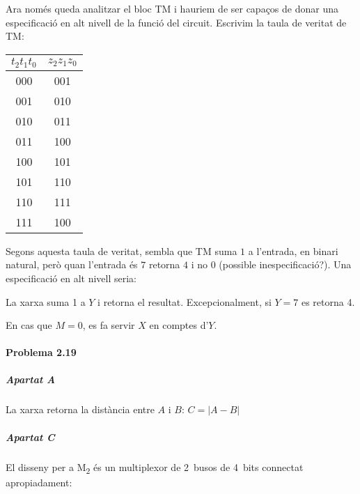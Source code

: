 Ara només queda analitzar el bloc \textsf{TM} i hauriem de ser capaços de donar una especificació en alt nivell de la funció del circuit. Escrivim la taula de veritat de \textsf{TM}:

\begin{center} \begin{tabular}{cc}
$t_2t_1t_0$ & $z_2z_1z_0$ \\
\hline
000 & 001 \\
001 & 010 \\
010 & 011 \\
011 & 100 \\
100 & 101 \\
101 & 110 \\
110 & 111 \\
111 & 100
\end{tabular} \end{center}

Segons aquesta taula de veritat, sembla que \textsf{TM} suma $1$ a l'entrada, en binari natural, però quan l'entrada és $7$ retorna $4$ i no $0$ (possible inespecificació?). Una especificació en alt nivell seria:

\begin{displayquote}
La xarxa suma 1 a $Y$ i retorna el resultat. Excepcionalment, si $Y=7$ es retorna 4.

En cas que $M=0$, es fa servir $X$ en comptes d'$Y$.
\end{displayquote}

\finishpage


\startpage
\paragraph{Problema 2.19} \hspace{0em}

\subparagraph{Apartat A}

La xarxa retorna la distància entre $A$ i $B$: $C = \left|A - B\right|$

\subparagraph{Apartat C} El disseny per a \textsf{M\textsubscript{2}} és un multiplexor de 2~busos de 4~bits connectat apropiadament:

\vspace{1.5em} %
\begin{center}  \end{center}

